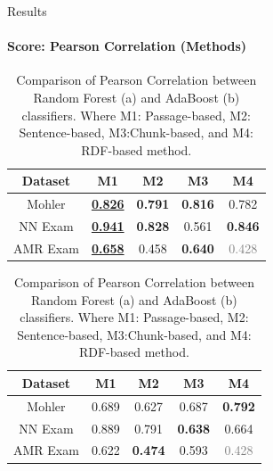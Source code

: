 \documentclass[aspectratio=169]{beamer}
\begin{document}
\begin{frame}{Results}
	\framesubtitle{Score: Pearson Correlation (Methods)}
\begin{table}
	\centering
	\begin{subtable}[c]{0.6\textwidth}
		
		\begin{tabular}{|c|c|c|c|c|}
			\hline
			Dataset & M1 & M2 & M3 & M4 \\
			\hline
			Mohler  & \underline{\textbf{0.826}}  &\textbf{0.791} &\textbf{0.816} &0.782 \\
			\hline
			NN Exam  &\underline{\textbf{0.941}} &\textbf{0.828} &0.561 &\textbf{0.846} \\
			\hline
			AMR Exam  &\underline{\textbf{0.658}} &0.458 &\textbf{0.640} & \textcolor{gray}{0.428} \\
			\hline
		\end{tabular}
		\subcaption{}
	\end{subtable}
\centering
	\begin{subtable}[c]{0.6\textwidth}
		
		\begin{tabular}{|c|c|c|c|c|}
			\hline
			Dataset & M1 & M2 & M3 & M4 \\
			\hline
			Mohler &0.689  &0.627 &0.687 &\textbf{0.792} \\
			\hline
			NN Exam &0.889 &0.791 &\textbf{0.638} &0.664 \\
			\hline
			AMR Exam &0.622 &\textbf{0.474} &0.593 &\textcolor{gray}{0.428} \\
			\hline
		\end{tabular}	
		\subcaption{}
	\end{subtable}
	\caption{Comparison of Pearson Correlation between Random Forest (a) and AdaBoost (b) classifiers. Where M1: Passage-based, M2: Sentence-based, M3:Chunk-based, and M4: RDF-based method.}
\end{table}
\end{frame}
\end{document}

